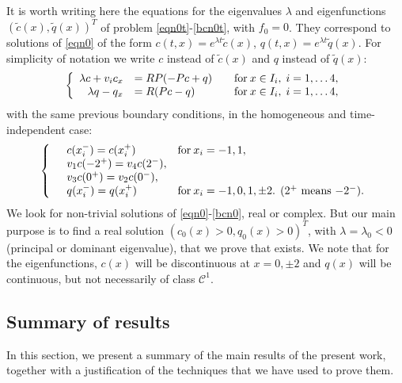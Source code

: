 \documentclass[a4paper]{article}
\numberwithin{equation}{section}
\begin{document}
It is worth writing here the equations for the eigenvalues $\lambda$ and eigenfunctions $(\tilde{c}(x), \tilde{q}(x))^T$ of problem \eqref{eqn0t}-\eqref{bcn0t}, with $f_0=0$. They correspond to solutions of \eqref{eqn0} of the form $c(t,x)=e^{\lambda t}\tilde{c}(x)$, $q(t,x)=e^{\lambda t}\tilde{q}(x)$. For simplicity of notation we write $c$ instead of $\tilde{c}(x)$ and $q$ instead of $\tilde{q}(x)$:
\begin{equation}\label{eqn0}
\left\{ \begin{array}{rll}
\lambda c+v_i c_x &= RP(-Pc+q)\quad &\hbox{for}\: x\in I_i, \; i=1,\dots 4, \\
\lambda q-q_x &= R(Pc-q)\quad &\hbox{for}\: x\in I_i, \; i=1,\dots 4,
\end{array}\right.
\end{equation}
with the same previous boundary conditions, in the homogeneous and time-independent case:
\begin{equation}\label{bcn0}
\left\{ \begin{array}{lll}
  &c(x_i^-)=c(x_i^+) & \hbox{for}\: x_i=-1,1,\\
  &v_1c(-2^+)=v_4c(2^-),&\\
  &v_3c(0^+)= v_2c(0^-),& \\
  &q(x_i^-)=q(x_i^+) & \hbox{for}\: x_i=-1,0,1,\pm 2 \hbox{. ($2^+$ means $-2^-$)}.
\end{array}\right.
\end{equation}
We look for non-trivial solutions of \eqref{eqn0}-\eqref{bcn0}, real or complex. But our main purpose is to find a real solution $(c_0(x)>0,q_0(x)>0)^T$, with $\lambda=\lambda_0<0$ (principal or dominant eigenvalue), that we prove that exists. We note that for the eigenfunctions, $c(x)$ will be discontinuous at $x=0, \pm 2$ and $q(x)$ will be continuous, but not necessarily of class $\mathcal{C}^1$.

\subsection{Summary of results}
In this section, we present a summary of the main results of the present work, together with a justification of the techniques that we have used to prove them.
\end{document}

